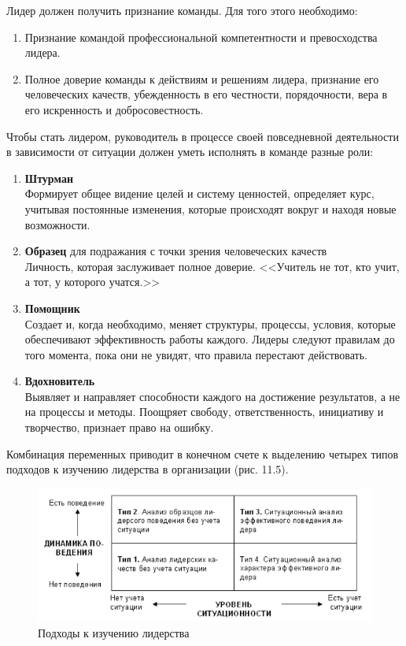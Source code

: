 \documentclass[a4paper,12pt,oneside,final]{extarticle}
\makeatletter
\numberwithin{equation}{section}
\def\maxwidth#1{\ifdim\Gin@nat@width>#1 #1\else\Gin@nat@width\fi}
\makeatother
\begin{document}
Лидер должен получить признание команды. 
Для того этого необходимо:
\begin{enumerate}
	\item Признание командой профессиональной компетентности и превосходства лидера.
	\item Полное доверие команды к действиям и решениям лидера, признание его человеческих качеств, убежденность в его честности, порядочности, вера в его искренность и добросовестность.
\end{enumerate}

Чтобы стать лидером, руководитель в процессе своей повседневной деятельности в зависимости от ситуации должен уметь исполнять в команде разные роли:
\begin{enumerate}
	\item \textbf{Штурман} \\
	Формирует общее видение целей и систему ценностей, определяет курс, учитывая постоянные изменения, которые происходят вокруг и находя новые возможности.
	\item \textbf{Образец} для подражания с точки зрения человеческих качеств \\
	Личность, которая заслуживает полное доверие. 
	<<Учитель не тот, кто учит, а тот, у которого учатся.>>
	\item \textbf{Помощник} \\
	Создает и, когда необходимо, меняет структуры, процессы, условия, которые обеспечивают эффективность работы каждого.
	Лидеры следуют правилам до того момента, пока они не увидят, что правила перестают действовать.
	\item \textbf{Вдохновитель} \\ 
	Выявляет и направляет способности каждого на достижение результатов, а не на процессы и методы. 
	Поощряет свободу, ответственность, инициативу и творчество, признает право на ошибку.
\end{enumerate}

Комбинация переменных приводит в конечном счете к выделению четырех типов подходов к изучению лидерства в организации (рис. 11.5).

\begin{figure}[h]
	\centering
	\includegraphics[width=\maxwidth{\textwidth}]{management-figures/leadership_methods}
	\caption{Подходы к изучению лидерства}
	\label{leadership_methods}
\end{figure}
\end{document}
